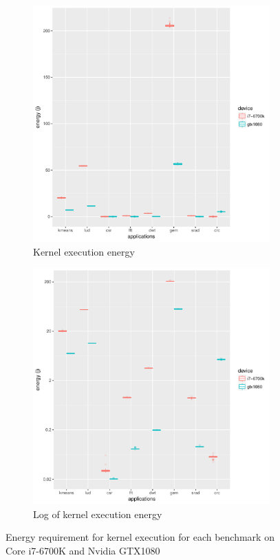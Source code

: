 \documentclass[../document.tex]{subfiles}
\begin{document}
\label{ssec:energy}

\begin{figure}[htb]
\begin{subfigure}{.49\textwidth}
\centering
\includegraphics[width=1\textwidth]{figures/energy-results/energy_charts.pdf}
\caption{Kernel execution energy}
\label{fig:energy}
\end{subfigure}
\hfill
\begin{subfigure}{.49\textwidth}
\centering
\includegraphics[width=1\textwidth]{figures/energy-results/energy_charts_log10.pdf}
\caption{Log of kernel execution energy}
\label{fig:energy-log}
\end{subfigure}
\caption{Energy requirement for kernel execution for each benchmark on Core i7-6700K and Nvidia GTX1080}
\end{figure}
\end{document}
